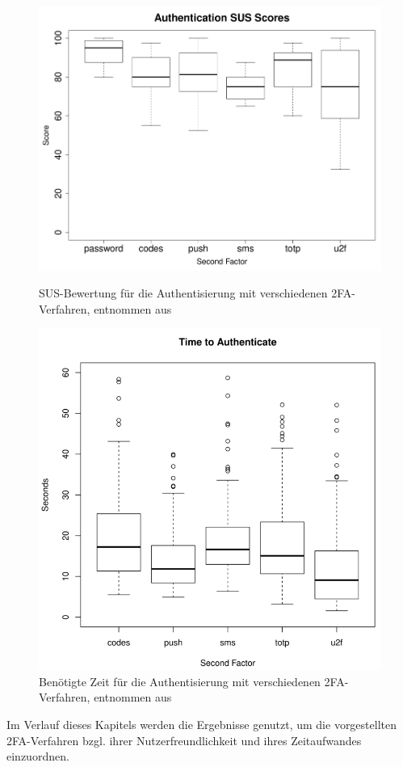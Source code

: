 \begin{figure}
    \begin{minipage}[b]{.48\textwidth}
        \centering
        \includegraphics[width=1\linewidth]{figures/susAuth.png}
        \caption[SUS-Bewertung für die Authentisierung mit verschiedenen 2FA-Verfahren]{SUS-Bewertung für die Authentisierung mit verschiedenen 2FA-Verfahren, entnommen aus \autocite[363]{Reese}}
        \label{fig: reese sus}
    \end{minipage}
    \hfill
    \begin{minipage}[b]{.48\textwidth}
        \centering
        \includegraphics[width=1\linewidth]{figures/timeToAuth.png}
        \caption[Benötigte Zeit für die Authentisierung mit verschiedenen 2FA-Verfahren]{Benötigte Zeit für die Authentisierung mit verschiedenen 2FA-Verfahren, entnommen aus \autocite[362]{Reese}}
        \label{fig: reese zeiten}
    \end{minipage}
\end{figure}

Im Verlauf dieses Kapitels werden die Ergebnisse genutzt, um die vorgestellten 
2FA-Verfahren bzgl. ihrer Nutzerfreundlichkeit und ihres Zeitaufwandes einzuordnen.
